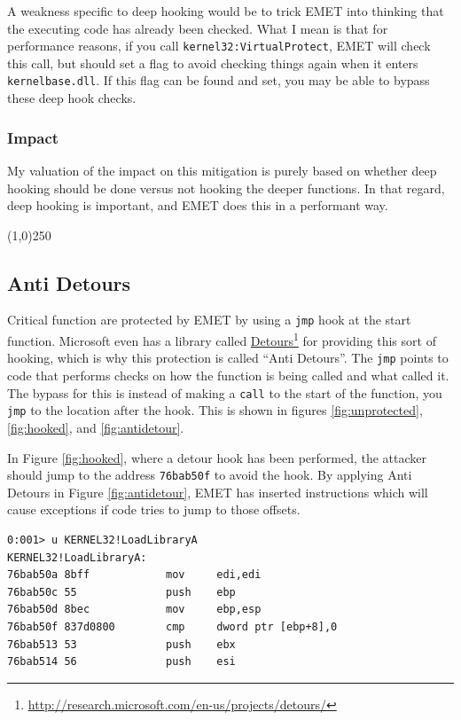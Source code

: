 \documentclass[]{article}
\newcommand{\fhref}[2]{\href{#1}{#2}\footnote{\url{#1}}}
\newcommand{\sectionbreakline}[0]{\begin{center}\line(1,0){250}\end{center}}
\begin{document}
A weakness specific to deep hooking would be to trick EMET into thinking that the executing code has already been checked.  What I mean is that for performance reasons, if you call  \texttt{kernel32:VirtualProtect}, EMET will check this call, but should set a flag to avoid checking things again when it enters \texttt{kernelbase.dll}.  If this flag can be found and set, you may be able to bypass these deep hook checks.


\subsubsection{Impact}
My valuation of the impact on this mitigation is purely based on whether deep hooking should be done versus not hooking the deeper functions.  In that regard, deep hooking is important, and EMET does this in a performant way.

\sectionbreakline{}












\subsection{Anti Detours}\label{anti-detours}
Critical function are protected by EMET by using a \texttt{jmp} hook at the start function.  Microsoft even has a library called \fhref{http://research.microsoft.com/en-us/projects/detours/}{Detours} for providing this sort of hooking, which is why this protection is called ``Anti Detours''.  The \texttt{jmp} points to code that performs checks on how the function is being called and what called it.  The bypass for this is instead of making a \texttt{call} to the start of the function, you \texttt{jmp} to the location after the hook.  This is shown in figures \ref*{fig:unprotected}, \ref*{fig:hooked}, and \ref*{fig:antidetour}.  

In Figure \ref*{fig:hooked}, where a detour hook has been performed, the attacker should jump to the address \texttt{76bab50f} to avoid the hook.  By applying Anti Detours in Figure \ref*{fig:antidetour}, EMET has inserted  instructions which will cause exceptions if code tries to jump to those offsets.


\begin{minipage}[t]{\textwidth}
\centering
\begin{verbatim}
0:001> u KERNEL32!LoadLibraryA
KERNEL32!LoadLibraryA:
76bab50a 8bff            mov     edi,edi
76bab50c 55              push    ebp
76bab50d 8bec            mov     ebp,esp
76bab50f 837d0800        cmp     dword ptr [ebp+8],0
76bab513 53              push    ebx
76bab514 56              push    esi
\end{verbatim}
  \label{fig:unprotected}
\end{minipage}
\end{document}
